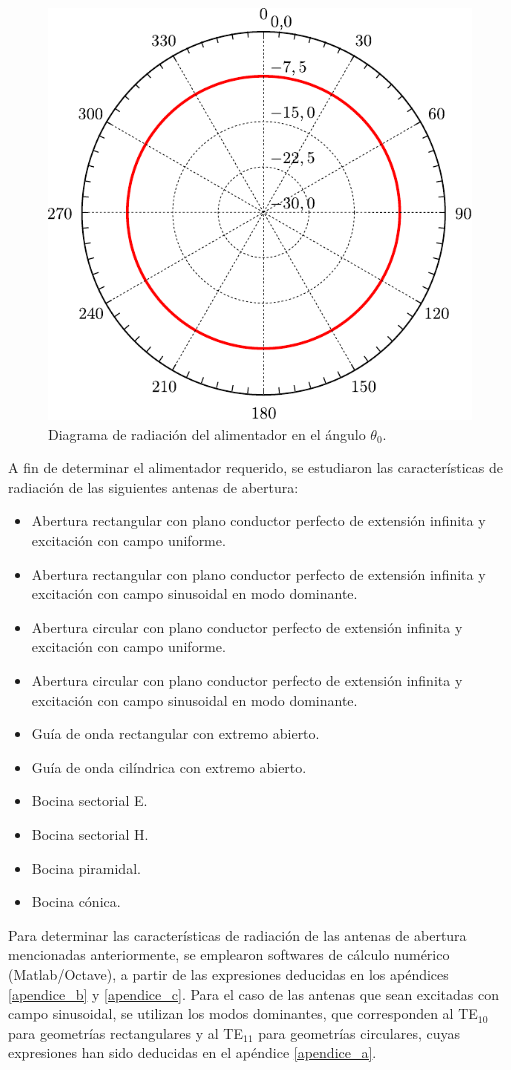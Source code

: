 \begin{figure}[H]
\centering
\includegraphics[scale = 1]{Figures/Estudio/estudio_1}
\caption{Diagrama de radiación del alimentador en el ángulo $\theta_0$.}
\label{fig_estudio:1}
\end{figure}
A fin de determinar el alimentador requerido, se estudiaron las características de radiación de las siguientes antenas de abertura:
\begin{itemize}
\item Abertura rectangular con plano conductor perfecto de extensión infinita y excitación con campo uniforme.
\item Abertura rectangular con plano conductor perfecto de extensión infinita y excitación con campo sinusoidal en modo dominante.
\item Abertura circular con plano conductor perfecto de extensión infinita y excitación con campo uniforme.
\item Abertura circular con plano conductor perfecto de extensión infinita y excitación con campo sinusoidal en modo dominante.
\item Guía de onda rectangular con extremo abierto.
\item Guía de onda cilíndrica con extremo abierto.
\item Bocina sectorial E.
\item Bocina sectorial H.
\item Bocina piramidal.
\item Bocina cónica.
\end{itemize}
Para determinar las características de radiación de las antenas de abertura mencionadas anteriormente, se emplearon softwares de cálculo numérico (Matlab/Octave), a partir de las expresiones deducidas en los apéndices \ref{apendice_b} y \ref{apendice_c}. Para el caso de las antenas que sean excitadas con campo sinusoidal, se utilizan los modos dominantes, que corresponden al TE$_{10}$ para geometrías rectangulares y al TE$_{11}$ para geometrías circulares, cuyas expresiones han sido deducidas en el apéndice \ref{apendice_a}.

